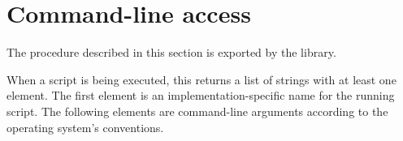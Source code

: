 \section{Command-line access}
\label{scriptlibsection}

The procedure described in this section is exported by the
 library.

\begin{entry}{%
}

When a script is being executed, this returns a list of strings with
at least one element.  The first element is an implementation-specific
name for the running script.  The following elements are command-line
arguments according to the operating system's conventions.
\end{entry}

